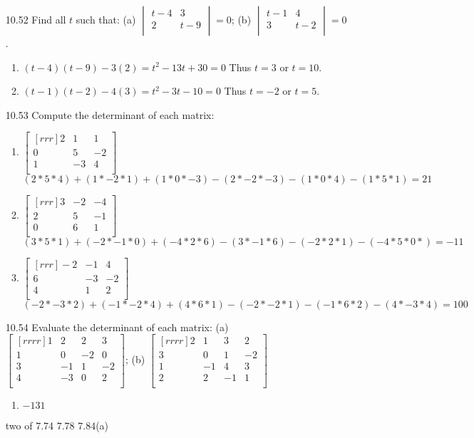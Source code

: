 \documentclass[12pt]{article}
\theoremstyle{definition}
\theoremstyle{plain}
\begin{document}
\begin{enumerate}
\item[10.52]Find all $t$ such that: (a) $\begin{vmatrix}t-4&3\\2&t-9\\\end{vmatrix} = 0$; (b) $\begin{vmatrix}t-1&4\\3&t-2\\\end{vmatrix} = 0$.
	\begin{enumerate}
	\item $(t-4)(t-9)-3(2) = t^2-13t+30 = 0$ Thus $t=3$ or $t=10$.
	\item $(t-1)(t-2)-4(3) = t^2-3t-10 = 0$ Thus $t=-2$ or $t=5$.
	\end{enumerate}

\item[10.53]Compute the determinant of each matrix:
	\begin{enumerate}
	\item $\begin{bmatrix}[rrr]2&1&1\\0&5&-2\\1&-3&4\\\end{bmatrix}$
	\[ (2*5*4)+(1*-2*1)+(1*0*-3)-(2*-2*-3)-(1*0*4)-(1*5*1) = 21 \]
	\item $\begin{bmatrix}[rrr]3&-2&-4\\2&5&-1\\0&6&1\\\end{bmatrix}$
	\[ (3*5*1)+(-2*-1*0)+(-4*2*6)-(3*-1*6)-(-2*2*1)-(-4*5*0*)=-11 \]
	\item $\begin{bmatrix}[rrr]-2&-1&4\\6&-3&-2\\4&1&2\\\end{bmatrix}$
	\[ (-2*-3*2)+(-1*-2*4)+(4*6*1)-(-2*-2*1)-(-1*6*2)-(4*-3*4) = 100 \]
	\end{enumerate}

\item[10.54]Evaluate the determinant of each matrix: (a) $\begin{bmatrix}[rrrr]1&2&2&3\\1&0&-2&0\\3&-1&1&-2\\4&-3&0&2\\\end{bmatrix}$; (b) $\begin{bmatrix}[rrrr]2&1&3&2\\3&0&1&-2\\1&-1&4&3\\2&2&-1&1\\\end{bmatrix}$
	\begin{enumerate}
	\item $-131$
	\end{enumerate}

\item[two of 7.74 7.78 7.84(a)]
\end{enumerate}
\end{document}
